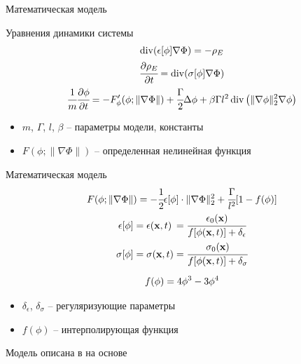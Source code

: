 \begin{frame}{Математическая модель}
\begin{block}{Уравнения динамики системы}
    \vspace{-2mm}
    \begin{gather*}
        \operatorname{{div}}(\epsilon[\phi] \nabla \Phi) = -\rho_E \\
        \cfrac{\partial \rho_E}{\partial t} = \operatorname{{div}}(\sigma[\phi] \nabla \Phi) \\
        \cfrac{1}{m} \cfrac{\partial \phi}{\partial t} = -F'_\phi( \phi; \| \nabla \Phi \|) + \cfrac{\Gamma}{2} \Delta \phi + \beta \Gamma l^2 \operatorname{{div}} \left( \| \nabla \phi \|_2^2 \nabla \phi \right)
    \end{gather*}
    \vspace{-4mm}
\end{block}
\begin{itemize}
    \item $m$, $\Gamma$, $l$, $\beta$ -- параметры модели, константы
    \item $F(\phi; \| \nabla \Phi \|)$ -- определенная нелинейная функция
\end{itemize}
\end{frame}


\begin{frame}{Математическая модель}
\vspace{-3mm}
\begin{gather*}
    F(\phi; \| \nabla \Phi \|) = -\cfrac{1}{2} \epsilon[\phi] \cdot \| \nabla \Phi \|_2^2 + \cfrac{\Gamma}{l^2} [1 - f(\phi)] \\
    \begin{alignedat}{3}
        \epsilon[\phi] &= \epsilon({\textbf{x}}, t) &&= \cfrac{\epsilon_0({\textbf{x}})}{f[\phi({\textbf{x}}, t)] + \delta_\epsilon} \\
        \sigma[\phi] &= \sigma({\textbf{x}}, t) &&= \cfrac{\sigma_0({\textbf{x}})}{f[\phi({\textbf{x}}, t)] + \delta_\sigma}
    \end{alignedat} \\[2mm]
    f(\phi) = 4 \phi^3 - 3 \phi^4
\end{gather*}
\vspace{-6mm}
\begin{itemize}
    \item $\delta_\epsilon$, $\delta_\sigma$ -- регуляризующие параметры
    \item $f(\phi)$ -- интерполирующая функция
\end{itemize}
\vspace{1mm}
\parind Модель описана в \cite{zipunova_computational} на основе \cite{pitike_dielectric_breakdown}
\end{frame}


